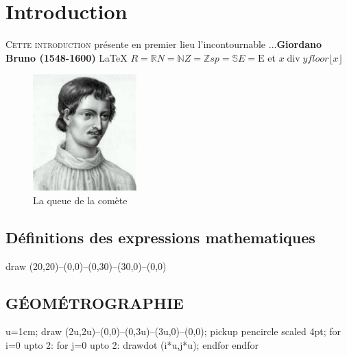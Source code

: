 \documentclass[12pt,a4paper,twocolumn]{book} %
\newcommand\myclearpage{\cleartooddpage[\thispagestyle{plain}]}		%
\newcommand{\floor}[1]{{\lfloor #1 \rfloor}}
\newcommand{\R}{\mathbb{R}}
\newcommand{\N}{\mathbb{N}}
\newcommand{\Z}{\mathbb{Z}}
\newcommand{\Sp}{\mathbb{S}}
\newcommand{\E}{\mathrm{E}}
\DeclareMathOperator{\ddiv}{div}
\begin{document}
\tableofcontents{}

\renewcommand{\listfigurename}{Liste des figures}
\listoffigures

\myclearpage

\chapter{Introduction}

\lettrine{C}{ette introduction} présente en premier lieu l'incontournable ...\textbf{Giordano Bruno (1548-1600)} \LaTeX{}
$R = \R N = \N Z = \Z sp= \Sp E = \E $ et   $x \ddiv y    floor \floor{x} $






\begin{figure}[t]
\caption[La taille des planètes]{La queue de la comète\label{billetcomete}}
\includegraphics[width=4cm]{Giordano_Bruno.eps}
\end{figure}

\section{Définitions des expressions mathematiques}


\begin{mpinline}
draw (20,20)--(0,0)--(0,30)--(30,0)--(0,0)
\end{mpinline}

\section{GÉOMÉTROGRAPHIE}

\begin{mpdisplay}
u=1cm;
draw (2u,2u)--(0,0)--(0,3u)--(3u,0)--(0,0);
pickup pencircle scaled 4pt;
for i=0 upto 2:
for j=0 upto 2: drawdot (i*u,j*u); endfor
endfor
\end{mpdisplay}
\end{document}
